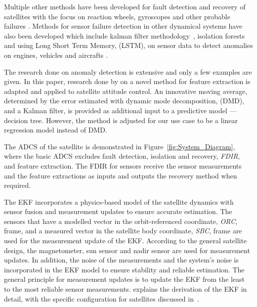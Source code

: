 \documentclass[letterpaper, 10 pt, conference]{ieeeconf}  %
\begin{document}
Multiple other methods have been developed for fault detection and recovery of satellites with the focus on reaction wheels, gyroscopes and other probable failures \cite{Tudoroiu2007, Pilastre2020, rahimi2020fault, jin2008fault, wander2013innovative, ibrahim2018machine, ibrahim2020machine}. Methods for sensor failure detection in other dynamical systems have also been developed which include kalman filter methodology~\cite{Ciftciogl1991}, isolation forests~\cite{Liu2021} and using Long Short Term Memory, (LSTM), on sensor data to detect anomalies on engines, vehicles and aircrafts \cite{Malhotra2016}. 

The research done on anomaly detection is extensive and only a few examples are given. In this paper, research done by \textcite{DeSilva2020} on a novel method for feature extraction is adapted and applied to satellite attitude control. An innovative moving average, determined by the error estimated with dynamic mode decomposition, (DMD), and a Kalman filter, is provided as additional input to a predictive model --- decision tree. However, the method is adjusted for our use case to be a linear regression model instead of DMD.


The ADCS of the satellite is demonstrated in Figure~\ref{fig:System_Diagram}, where the basic ADCS excludes fault detection, isolation and recovery, \emph{FDIR}, and feature extraction. The FDIR for sensors receive the sensor measurements and the feature extractions as inputs and outputs the recovery method when required. 

The EKF incorporates a physics-based model of the satellite dynamics with sensor fusion and measurement updates to ensure accurate estimation. The sensors that have a modelled vector in the orbit-referenced coordinate, \emph{ORC}, frame, and a measured vector in the satellite body coordinate, \emph{SBC}, frame are used for the measurement update of the EKF. According to the general satellite design, the magnetometer, sun sensor and nadir sensor are used for measurement updates. In addition, the noise of the measurements and the system's noise is incorporated in the EKF model to ensure stability and reliable estimation. The general principle for measurement updates is to update the EKF from the least to the most reliable sensor measurements. \textcite{Jones2017} explains the derivation of the EKF in detail, with the specific configuration for satellites discussed in~\textcite{JansevanVuuren2015}.
\end{document}
